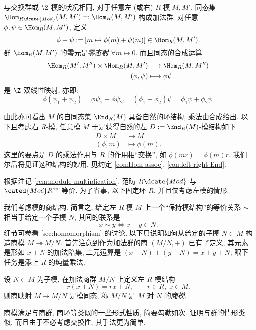 \begin{remark}\label{rem:Mod-cat-preadditive}
	与交换群或 $\Z$-模的状况相同, 对于任意左 (或右) $R$-模 $M, M'$, 同态集 $\Hom_{R\dcate{Mod}}(M, M') =: \Hom_R(M, M')$ 构成加法群: 对任意 $\phi, \psi \in \Hom_R(M, M')$, 定义
	\[ \phi + \psi := [m \mapsto \phi(m) + \psi(m) ] \in \Hom_R(M, M'). \]
	群 $\Hom_R(M, M')$ 的零元是\emph{零态射} $\forall m \mapsto 0$. 而且同态的合成运算
	\begin{align*}
		\Hom_R(M', M'') \times \Hom_R(M, M') & \longrightarrow \Hom_R(M, M'') \\
		(\phi, \psi) & \longmapsto \phi \psi
	\end{align*}
	是 $\Z$-双线性映射, 亦即:
	\[ \phi(\psi_1 + \psi_2) = \phi\psi_1 + \phi\psi_2, \quad (\phi_1 + \phi_2)\psi = \phi_1\psi + \phi_2\psi. \]

	由此亦可看出 $M$ 的自同态集 $\End_R(M)$ 具备自然的环结构, 乘法由合成给出. 以下且考虑右 $R$-模, 任意模 $M$ 于是获得自然的左 $D := \End_R(M)$-模结构如下
	\begin{align*}
		D \times M & \longrightarrow M \\
		(\phi, m) & \longmapsto \phi(m).
	\end{align*}
	这里的要点是 $D$ 的乘法作用与 $R$ 的作用相``交换'', 如 $\phi(mr)=\phi(m)r$. 我们尔后将见证这种结构的妙用, 见约定 \ref{con:Hom-assoc}, \ref{con:left-right-End}.
\end{remark}

根据注记 \ref{rem:module-multiplication}, 范畴 $R\dcate{Mod}$ 与 $\cated{Mod}R^\text{op}$ 等价. 为了省事, 以下固定环 $R$, 并且仅考虑左模的情形.

我们考虑模的商结构. 简言之, 给定左 $R$-模 $M$ 上一个``保持模结构''的等价关系 $\sim$ 相当于给定一个子模 $N$, 其间的联系是
\[ x \sim y \iff x-y \in N. \]
细节可参看 \ref{sec:homomorphism} 的讨论. 以下只说明如何从给定的子模 $N \subset M$ 构造商模 $M \twoheadrightarrow M/N$. 首先注意到作为加法群的商 $(M/N, +)$ 已有了定义, 其元素是形如 $x+N$ 的加法陪集, 二元运算是 $(x+N) + (y+N) = x+y + N$; 眼下任务是添上 $R$ 的纯量乘法.

\begin{definition}
	设 $N \subset M$ 为子模, 在加法商群 $M/N$ 上定义左 $R$-模结构
	\[ r (x+N) = rx + N, \qquad r \in R, \; x \in M. \]
	则商映射 $M \to M/N$ 是模同态, 称 $M/N$ 是 $M$ 对 $N$ 的\emph{商模}.
\end{definition}

商模满足与商群, 商环等类似的一些形式性质, 简要勾勒如次. 证明与群的情形类似, 而且由于不必考虑交换性, 其手法更为简单.

